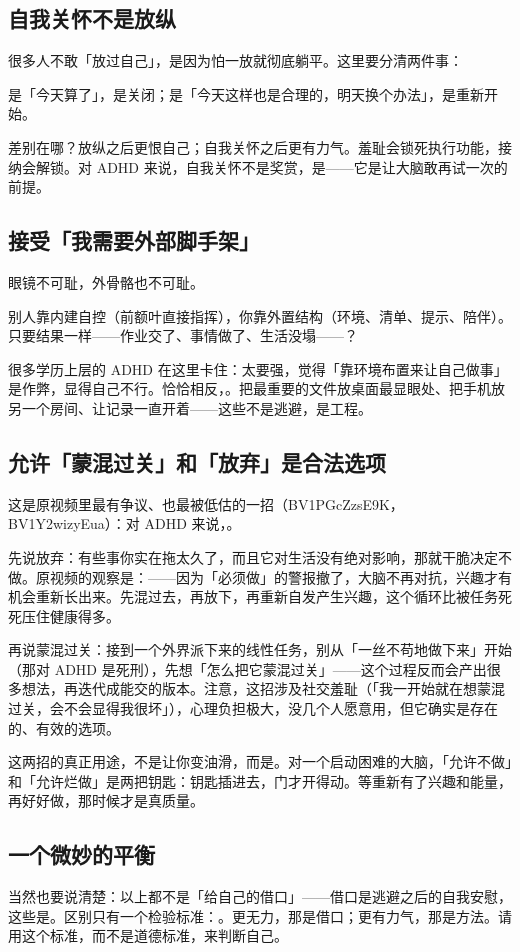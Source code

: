 \subsection{自我关怀不是放纵}

很多人不敢「放过自己」，是因为怕一放就彻底躺平。这里要分清两件事：

是「今天算了」，是关闭；是「今天这样也是合理的，明天换个办法」，是重新开始。

差别在哪？放纵之后更恨自己；自我关怀之后更有力气。羞耻会锁死执行功能，接纳会解锁。对 ADHD 来说，自我关怀不是奖赏，是——它是让大脑敢再试一次的前提。

\subsection{接受「我需要外部脚手架」}

眼镜不可耻，外骨骼也不可耻。

别人靠内建自控（前额叶直接指挥），你靠外置结构（环境、清单、提示、陪伴）。只要结果一样——作业交了、事情做了、生活没塌——？

很多学历上层的 ADHD 在这里卡住：太要强，觉得「靠环境布置来让自己做事」是作弊，显得自己不行。恰恰相反，。把最重要的文件放桌面最显眼处、把手机放另一个房间、让记录一直开着——这些不是逃避，是工程。

\subsection{允许「蒙混过关」和「放弃」是合法选项}

这是原视频里最有争议、也最被低估的一招（BV1PGcZzsE9K，BV1Y2wizyEua）：对 ADHD 来说，。

先说放弃：有些事你实在拖太久了，而且它对生活没有绝对影响，那就干脆决定不做。原视频的观察是：——因为「必须做」的警报撤了，大脑不再对抗，兴趣才有机会重新长出来。先混过去，再放下，再重新自发产生兴趣，这个循环比被任务死死压住健康得多。

再说蒙混过关：接到一个外界派下来的线性任务，别从「一丝不苟地做下来」开始（那对 ADHD 是死刑），先想「怎么把它蒙混过关」——这个过程反而会产出很多想法，再迭代成能交的版本。注意，这招涉及社交羞耻（「我一开始就在想蒙混过关，会不会显得我很坏」），心理负担极大，没几个人愿意用，但它确实是存在的、有效的选项。

\begin{notehot}
这两招的真正用途，不是让你变油滑，而是。对一个启动困难的大脑，「允许不做」和「允许烂做」是两把钥匙：钥匙插进去，门才开得动。等重新有了兴趣和能量，再好好做，那时候才是真质量。
\end{notehot}

\subsection{一个微妙的平衡}

当然也要说清楚：以上都不是「给自己的借口」——借口是逃避之后的自我安慰，这些是。区别只有一个检验标准：。更无力，那是借口；更有力气，那是方法。请用这个标准，而不是道德标准，来判断自己。

